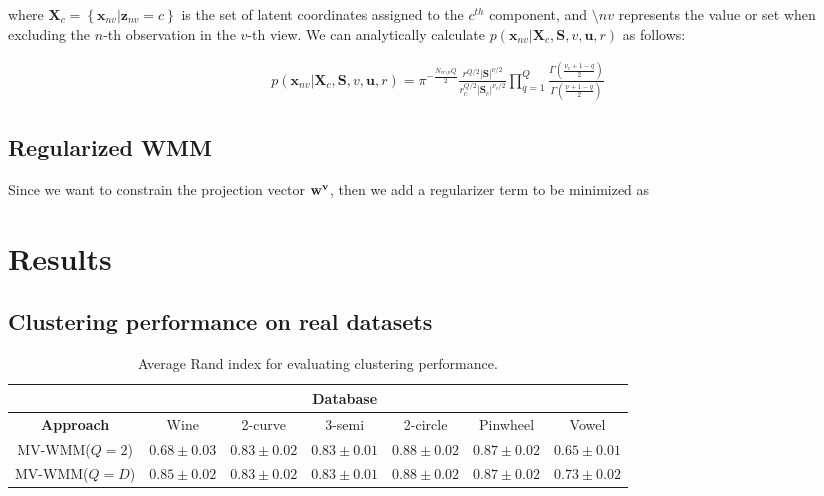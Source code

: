 \documentclass[]{article}
\newcommand{\Scluster}{\mathbf{S}}
\newcommand{\setX}{\mathbf{X}}
\newcommand{\obspv}{\mathbf{x}_{nv}}
\begin{document}
where $\setX_c = \left\{\obspv|\mathbf{z}_{nv}=c\right\}$ is the set of latent coordinates
assigned to the $c^{th}$ component, and $\setminus{nv}$ represents
the value or set when excluding the $n$-th observation in the $v$-th view. We can analytically calculate $p\left(\obspv|\setX_c, \Scluster,v,\mathbf{u},r\right)$  as follows:

\begin{align*}
p\left(\obspv|\setX_c, \Scluster,v,\mathbf{u},r\right) = \pi^{-\frac{N_{vc\setminus n}Q}{2}}\frac{r^{Q/2}|\Scluster|^{\nu/2}}{r_c^{Q/2}|\Scluster_c|^{\nu_c/2}}\prod_{q=1}^{Q}\frac{\Gamma\left(\frac{\nu_c + 1 -q}{2}\right)}{\Gamma\left(\frac{\nu + 1 -q}{2}\right)}
\end{align*}


\subsection{Regularized WMM}

Since we want to constrain the projection vector $\bf{w}^v$, then we add a regularizer term to be minimized as



\section{Results}

\subsection{Clustering performance on real datasets}

\begin{table}[ht!]
	\centering
	\caption{Average Rand index for evaluating clustering performance.}
	\label{tab:comparison1}
	\begin{tabular}{c c c c c c c}
		\cline{2-7}
		& \multicolumn{5}{c}{\textbf{Database}}\\
		\hline
		\textbf{Approach} &  	Wine & 2-curve & 3-semi & 2-circle & Pinwheel& Vowel\\
		\hline\hline
		\hline
		MV-WMM($Q=2$) & $0.68\pm0.03$  &$0.83\pm0.02$ &$0.83\pm0.01$&$0.88\pm0.02$&$0.87\pm0.02$ & $0.65\pm0.01$\\
		MV-WMM($Q=D$) & $0.85\pm 0.02$ &$0.83\pm0.02$&$0.83\pm0.01$&$0.88\pm0.02$&$0.87\pm0.02$&$0.73\pm0.02$\\
		\hline

	\end{tabular}
\end{table}
\end{document}

